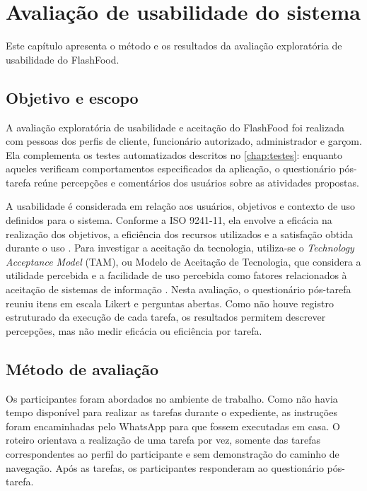 \chapter[Avaliação de usabilidade do sistema]{Avaliação de usabilidade do sistema}
\label{chap:usabilidade}

Este capítulo apresenta o método e os resultados da avaliação exploratória de usabilidade do FlashFood.

\section{Objetivo e escopo}

A avaliação exploratória de usabilidade e aceitação do FlashFood foi realizada com pessoas dos perfis de cliente, funcionário autorizado, administrador e garçom. Ela complementa os testes automatizados descritos no \autoref{chap:testes}: enquanto aqueles verificam comportamentos especificados da aplicação, o questionário pós-tarefa reúne percepções e comentários dos usuários sobre as atividades propostas.

A usabilidade é considerada em relação aos usuários, objetivos e contexto de uso definidos para o sistema. Conforme a ISO 9241-11, ela envolve a eficácia na realização dos objetivos, a eficiência dos recursos utilizados e a satisfação obtida durante o uso \cite{ISO9241_11_2018}. Para investigar a aceitação da tecnologia, utiliza-se o \textit{Technology Acceptance Model} (TAM), ou Modelo de Aceitação de Tecnologia, que considera a utilidade percebida e a facilidade de uso percebida como fatores relacionados à aceitação de sistemas de informação \cite{Davis1989TAM}. Nesta avaliação, o questionário pós-tarefa reuniu itens em escala Likert e perguntas abertas. Como não houve registro estruturado da execução de cada tarefa, os resultados permitem descrever percepções, mas não medir eficácia ou eficiência por tarefa.

\section{Método de avaliação}

Os participantes foram abordados no ambiente de trabalho. Como não havia tempo disponível para realizar as tarefas durante o expediente, as instruções foram encaminhadas pelo WhatsApp para que fossem executadas em casa. O roteiro orientava a realização de uma tarefa por vez, somente das tarefas correspondentes ao perfil do participante e sem demonstração do caminho de navegação. Após as tarefas, os participantes responderam ao questionário pós-tarefa.

